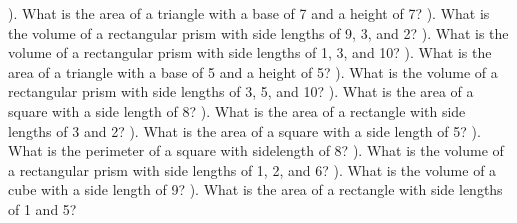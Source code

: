 \documentclass{article}%
\begin{document}
). What is the area of a triangle with a base of 7 and a height of 7?%
\newline%
\newline%
). What is the volume of a rectangular prism with side lengths of 9, 3, and 2?%
\newline%
\newline%
). What is the volume of a rectangular prism with side lengths of 1, 3, and 10?%
\newline%
\newline%
). What is the area of a triangle with a base of 5 and a height of 5?%
\newline%
\newline%
). What is the volume of a rectangular prism with side lengths of 3, 5, and 10?%
\newline%
\newline%
). What is the area of a square with a side length of 8?%
\newline%
\newline%
). What is the area of a rectangle with side lengths of 3 and 2?%
\newline%
\newline%
). What is the area of a square with a side length of 5?%
\newline%
\newline%
). What is the perimeter of a square with sidelength of 8?%
\newline%
\newline%
). What is the volume of a rectangular prism with side lengths of 1, 2, and 6?%
\newline%
\newline%
). What is the volume of a cube with a side length of 9?%
\newline%
\newline%
). What is the area of a rectangle with side lengths of 1 and 5?%
\newline%
\newline%
\end{document}
